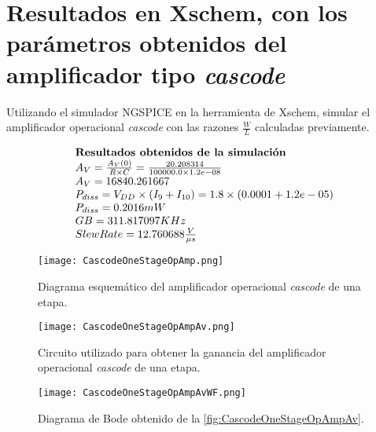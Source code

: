 \section{Resultados en Xschem, con los parámetros obtenidos del amplificador tipo \textit{cascode} \label{sec:s2}}

\begin{center}
	\begin{minipage}{12cm}
		\begin{tcolorbox}[title=Actividad 2]
			Utilizando el simulador NGSPICE en la herramienta de Xschem, simular el amplificador operacional \textit{cascode} con las razones $\frac{W}{L}$ calculadas previamente.
		\end{tcolorbox}	
	\end{minipage}
\end{center}

\begin{equation*}
	\begin{array}{l l}
		\textbf{Resultados obtenidos de la simulación} \\
		A_{V} = \frac{A_{V}(0)}{R \times C} = \frac{ 20.208314 }{ 100000.0 \times 1.2e-08 } \\
		A_{V} =  16840.261667  \\
		P_{diss} = V_{DD} \times (I_{9}+I_{10}) =  1.8 \times ( 0.0001  +  1.2e-05 ) \\
		P_{diss} =  0.2016  mW \\
		GB =  311.817097  KHz \\
		Slew Rate =  12.760688 \frac{V}{\mu s} \\
	\end{array}
\end{equation*}

\begin{figure}[ht]
	\centering
	\texttt{[image: CascodeOneStageOpAmp.png]}
	\caption{Diagrama esquemático del amplificador operacional \textit{cascode} de una etapa. \label{fig:CascodeOneStageOpAmp}}
\end{figure}

\begin{figure}[ht]
	\centering
	\texttt{[image: CascodeOneStageOpAmpAv.png]}
	\caption{Circuito utilizado para obtener la ganancia del amplificador operacional \textit{cascode} de una etapa. \label{fig:CascodeOneStageOpAmpAv}}
\end{figure}

\begin{figure}[ht]
	\centering
	\texttt{[image: CascodeOneStageOpAmpAvWF.png]}
	\caption{Diagrama de Bode obtenido de la \autoref{fig:CascodeOneStageOpAmpAv}. \label{fig:CascodeOneStageOpAmpAvWF}}
\end{figure}

